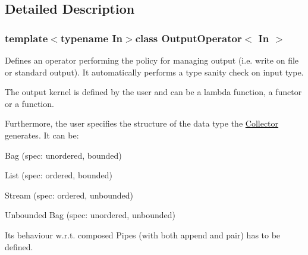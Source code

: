 \subsection{\-Detailed \-Description}
\subsubsection*{template$<$typename In$>$class Output\-Operator$<$ In $>$}

\-Defines an operator performing the policy for managing output (i.\-e. write on file or standard output). \-It automatically performs a type sanity check on input type.

\-The output kernel is defined by the user and can be a lambda function, a functor or a function.

\-Furthermore, the user specifies the structure of the data type the \hyperlink{class_collector}{\-Collector} generates. \-It can be\-:
\begin{DoxyItemize}
\item \-Bag (spec\-: unordered, bounded)
\item \-List (spec\-: ordered, bounded)
\item \-Stream (spec\-: ordered, unbounded)
\item \-Unbounded \-Bag (spec\-: unordered, unbounded)
\end{DoxyItemize}

\-Its behaviour w.\-r.\-t. composed \-Pipes (with both append and pair) has to be defined. 

